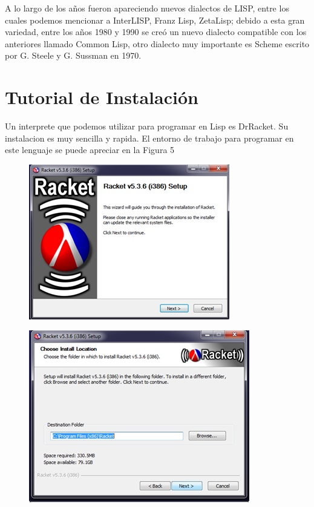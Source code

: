 \documentclass[11pt]{article} %
\begin{document}
A lo largo de los años fueron apareciendo nuevos dialectos de LISP, entre los cuales podemos
mencionar a InterLISP, Franz Lisp,  ZetaLisp; debido a esta gran variedad, entre los años 1980 y 
1990 se creó un nuevo dialecto compatible con los anteriores llamado Common Lisp, otro 
dialecto muy importante es Scheme escrito por G. Steele y G. Sussman  en 1970.\\



\section{Tutorial de Instalación}
Un interprete que podemos utilizar para programar en Lisp es DrRacket. Su instalacion es muy sencilla y rapida.
El entorno de trabajo para programar en este lenguaje se puede apreciar en la Figura 5


\begin{figure}[h]
\centering
    \includegraphics{imagenes_investigacion/paso_uno.jpg}
\caption {}
\label{Figura 1}
\end{figure}

\begin{figure}[h]
\centering
    \includegraphics{imagenes_investigacion/paso_dos.jpg}
\caption { }
\label{Figura 2}
\end{figure}
\end{document}

